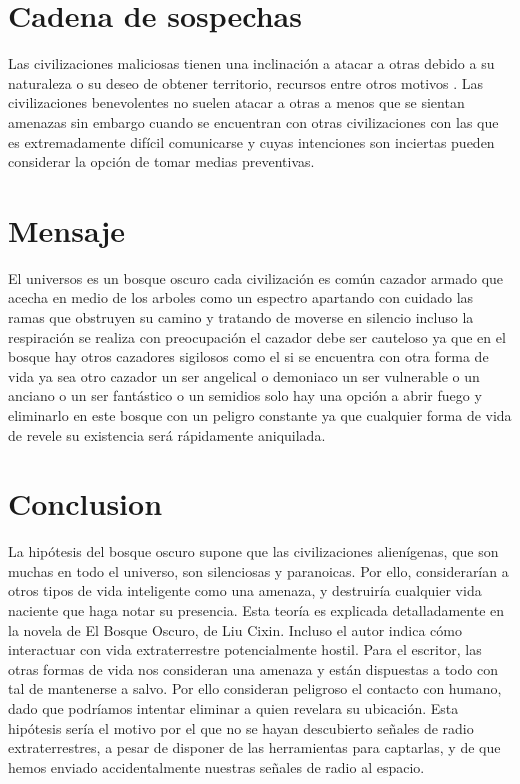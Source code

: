 \documentclass[12pt a4paper]{article}
\begin{document}
\section{Cadena de sospechas}
Las civilizaciones maliciosas tienen una inclinación a atacar a otras debido a su naturaleza o su deseo de obtener territorio, recursos entre otros motivos .
Las civilizaciones benevolentes no suelen atacar a otras a menos que se sientan amenazas sin embargo cuando se encuentran con otras civilizaciones con las que es extremadamente difícil comunicarse y cuyas intenciones son inciertas pueden considerar la opción de tomar medias preventivas.
\section{Mensaje}
El universos es un bosque oscuro cada civilización es común cazador armado que acecha en medio de los arboles como un espectro apartando con cuidado las ramas que obstruyen su camino y tratando de moverse en silencio incluso la respiración se realiza con preocupación el cazador debe ser cauteloso ya que en el bosque hay otros cazadores sigilosos como el si se encuentra con otra forma de vida ya sea otro cazador un ser angelical o demoniaco un ser vulnerable o un anciano o un ser fantástico o un semidios solo hay una opción a abrir fuego y eliminarlo en este bosque con un peligro constante ya que cualquier forma de vida de revele su existencia será rápidamente aniquilada.
\section{Conclusion}
La hipótesis del bosque oscuro supone que las civilizaciones alienígenas, que son muchas en todo el universo, son silenciosas y paranoicas. Por ello, considerarían a otros tipos de vida inteligente como una amenaza, y destruiría cualquier vida naciente que haga notar su presencia. Esta teoría es explicada detalladamente en la novela de El Bosque Oscuro, de Liu Cixin. Incluso el autor indica cómo interactuar con vida extraterrestre potencialmente hostil. Para el escritor, las otras formas de vida nos consideran una amenaza y están dispuestas a todo con tal de mantenerse a salvo. Por ello consideran peligroso el contacto con humano, dado que podríamos intentar eliminar a quien revelara su ubicación. Esta hipótesis sería el motivo por el que no se hayan descubierto señales de radio extraterrestres, a pesar de disponer de las herramientas para captarlas, y de que hemos enviado accidentalmente nuestras señales de radio al espacio.
\end{document}
